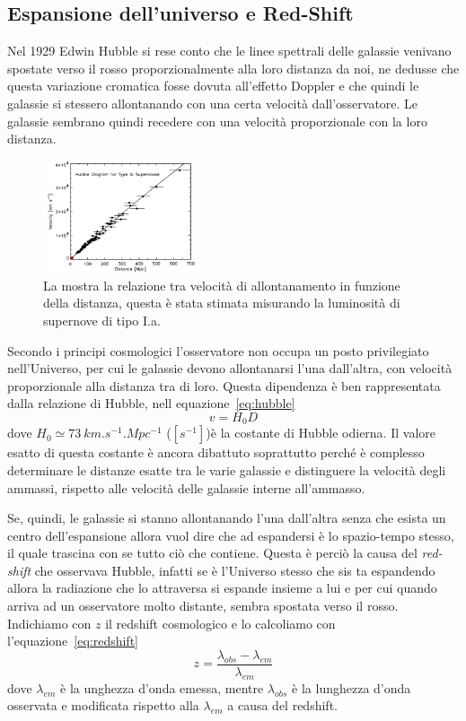 \subsection{Espansione dell'universo e Red-Shift}\label{sec:espansione}

Nel 1929 Edwin Hubble si rese conto che le linee spettrali delle galassie venivano spostate verso il rosso proporzionalmente alla loro distanza da noi, ne dedusse che questa variazione cromatica fosse dovuta all'effetto Doppler e che quindi le galassie si stessero allontanando con una certa velocità dall'osservatore. Le galassie sembrano quindi recedere con una velocità proporzionale con la loro distanza.

\begin{figure}
    \centering
    \includegraphics[width=0.4\textwidth]{immagini/redshift.png}
    \caption{La mostra la relazione tra velocità di allontanamento in funzione della distanza, questa è stata stimata misurando la luminosità di supernove di tipo I.a.}\label{fig:redshift}
\end{figure}

Secondo i principi cosmologici l'osservatore non occupa un posto privilegiato nell'Universo, per cui le galassie devono allontanarsi l'una dall'altra, con velocità proporzionale alla distanza tra di loro. Questa dipendenza è ben rappresentata dalla relazione di Hubble, nell equazione~\ref{eq:hubble}
\begin{equation}\label{eq:hubble}
    v = H_0 D
\end{equation}
dove $H_0 \simeq \SI{73}{km.s^{-1}.Mpc^{-1}}$ ($[s^{-1}]$)è la costante di Hubble odierna. Il valore esatto di questa costante è ancora dibattuto soprattutto perché è complesso determinare le distanze esatte tra le varie galassie e distinguere la velocità degli ammassi, rispetto alle velocità delle galassie interne all'ammasso.

Se, quindi, le galassie si stanno allontanando l'una dall'altra senza che esista un centro dell'espansione allora vuol dire che ad espandersi è lo spazio-tempo stesso, il quale trascina con se tutto ciò che contiene. Questa è perciò la causa del \textit{red-shift} che osservava Hubble, infatti se è l'Universo stesso che sis ta espandendo allora la radiazione che lo attraversa si espande insieme a lui e per cui quando arriva ad un osservatore molto distante, sembra spostata verso il rosso. Indichiamo con $z$ il redshift cosmologico e lo calcoliamo con l'equazione~\ref{eq:redshift}
\begin{equation}\label{eq:redshift}
    z = \frac{\lambda_{obs} - \lambda_{em}}{\lambda_{em}}
\end{equation}
dove $\lambda_{em}$ è la unghezza d'onda emessa, mentre $\lambda_{obs}$ è la lunghezza d'onda osservata e modificata rispetto alla $\lambda_{em}$ a causa del redshift.

